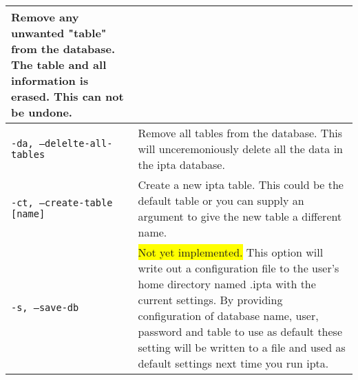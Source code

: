 \documentclass[english,twoside,openright,a4paper,12pt]{article}
\newcommand{\hilight}[1]{\colorbox{yellow}{#1}}
\begin{document}
\begin{longtable}{|p{}|p{}|}
Remove any unwanted "table" from the database. The table and all
information is erased. This can not be undone.\\\hline

\texttt{-da, --delelte-all-tables} & 

Remove all tables from the database. This will unceremoniously delete
all the data in the ipta database.\\\hline

\texttt{-ct, --create-table [name]} & 

Create a new ipta table. This could be the default table or you can
supply an argument to give the new table a different name. \\\hline

\texttt{-s, --save-db} & 

\hilight{Not yet implemented.} This option will write out a
configuration file to the user's home directory named .ipta with the
current settings. By providing configuration of database name, user,
password and table to use as default these setting will be written to
a file and used as default settings next time you run ipta.\\\hline
\end{longtable}
\normalsize
\end{document}

